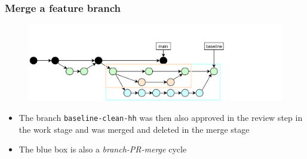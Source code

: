 \documentclass[aspectratio=169]{beamer} %
\begin{document}
\begin{frame}
	\frametitle{Merge a feature branch}

	\vspace{-.5cm}
	\begin{minipage}[t][5cm][t]{\textwidth}
		\begin{figure}
			\centering
			\includegraphics[width=\textwidth]{./img/dime-gitflow-network-2-5.png}
		\end{figure}
	\end{minipage}

	\vspace{-.5cm}
	\begin{minipage}[t][5cm][t]{\textwidth}
		\begin{itemize}
			\setlength\itemsep{.5em}
			\item The branch \texttt{baseline-clean-hh} was then also approved in the review step in the work stage and was merged and deleted in the merge stage
			\item The blue box is also a \textit{branch-PR-merge} cycle
		\end{itemize}
	\end{minipage}
\end{frame}
\end{document}
